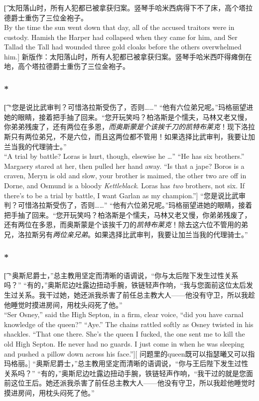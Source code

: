 \documentclass[12pt,a4paper]{article}
\begin{document}
\subsubsection{}\t[
	太阳落山时，所有人犯都已被拿获归案。竖琴手哈米西病得下不了床，高个塔拉德爵士重伤了三位金袍子。\\
	By the time the sun went down that day, all of the accused traitors were in custody. Hamish the Harper had collapsed when they came for him, and Ser Tallad the Tall had wounded three gold cloaks before the others overwhelmed him.]
	新版作：太阳落山时，所有人犯都已被拿获归案。竖琴手哈米西吓得瘫倒在地，高个塔拉德爵士重伤了三位金袍子。
	
\subsubsection{\color{red}*}\t[
	“您是说比武审判？可惜洛拉斯受伤了，否则……” “他有六位弟兄呢。”玛格丽望进她的眼睛，接着把手抽了回来。“您开玩笑吗？柏洛斯是个懦夫，马林又老又慢，你弟弟残废了，还有两位在多恩，\emph{而奥斯蒙是个该挨千刀的凯特布莱克}！现下洛拉斯只有两位弟兄，不是六位，而且这两位都不管用！如果选择比武审判，我要让加兰当我的代理骑士。”\\
	“A trial by battle? Loras is hurt, though, elsewise he …”  “He has six brothers.” Margaery stared at her, then pulled her hand away. “Is that a jape? Boros is a craven, Meryn is old and slow, your brother is maimed, the other two are off in Dorne, and Osmund is a bloody \emph{Kettleblack}. Loras has \emph{two} brothers, not six. If there's to be a trial by battle, I want Garlan as my champion.”]
	“您是说比武审判？可惜洛拉斯受伤了，否则……” “他有六位弟兄呢。”玛格丽望进她的眼睛，接着把手抽了回来。“您开玩笑吗？柏洛斯是个懦夫，马林又老又慢，你弟弟残废了，还有两位在多恩，而奥斯蒙是个该挨千刀的\emph{凯特布莱克}！除去这六位不管用的弟兄，洛拉斯另有\emph{两位亲兄弟}。如果选择比武审判，我要让加兰当我的代理骑士。”

\subsubsection{\color{red}*}\t[
	“奥斯尼爵士，”总主教用坚定而清晰的语调说，“你与太后陛下发生过性关系吗？” “有的，”奥斯尼边吐露边扭动手腕，铁链轻声作响，“我与您面前这位太后发生过关系。我干过她，她还派我杀害了前任总主教大人——他没有守卫，所以我趁他睡觉时摸进房间，用枕头闷死了他。” \\
	“Ser Osney,” said the High Septon, in a firm, clear voice, “did you have carnal knowledge of the queen?” “Aye.” The chains rattled softly as Osney twisted in his shackles. “That one there. She's the queen I fucked, the one sent me to kill the old High Septon. He never had no guards. I just come in when he was sleeping and pushed a pillow down across his face.”][
	问题里的queen既可以指瑟曦又可以指玛格丽。]
	“奥斯尼爵士，”总主教用坚定而清晰的语调说，“你与王后陛下发生过性关系吗？” “有的，”奥斯尼边吐露边扭动手腕，铁链轻声作响，“我干过的就是您面前这位王后。她还派我杀害了前任总主教大人——他没有守卫，所以我趁他睡觉时摸进房间，用枕头闷死了他。” 
		
\end{document}
